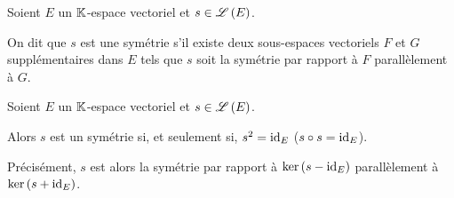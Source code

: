 \begin{defi}
Soient \(E\) un \(\mathbb{K}\)-espace vectoriel et \(s\in\mathscr{L}\left(E\right)\).

On dit que \(s\) est une symétrie s'il existe deux sous-espaces vectoriels \(F\) et \(G\) supplémentaires dans \(E\) tels que \(s\) soit la symétrie par rapport à \(F\) parallèlement à \(G\).
\end{defi}

\begin{prop}
Soient \(E\) un \(\mathbb{K}\)-espace vectoriel et \(s\in\mathscr{L}\left(E\right)\).

Alors \(s\) est un symétrie si, et seulement si, \(s^2=\mathrm{id}_{E}\) (\cad \(s\circ s=\mathrm{id}_{E}\)).

Précisément, \(s\) est alors la symétrie par rapport à \(\ker\left(s-\mathrm{id}_{E}\right)\) parallèlement à \(\ker\left(s+\mathrm{id}_{E}\right)\).
\end{prop}

